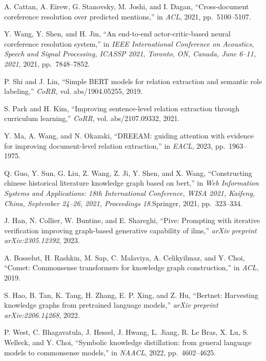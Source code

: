 \begin{enumerate}[leftmargin=2em,label={[\arabic*]}]
\item A. Cattan, A. Eirew, G. Stanovsky, M. Joshi, and I. Dagan, ``Cross-document coreference resolution over predicted mentions,'' in \textit{ACL}, 2021, pp.~5100--5107.

\item Y. Wang, Y. Shen, and H. Jin, ``An end-to-end actor-critic-based neural coreference resolution system,'' in \textit{IEEE International Conference on Acoustics, Speech and Signal Processing, ICASSP 2021, Toronto, ON, Canada, June 6--11, 2021}, 2021, pp.~7848--7852.

\item P. Shi and J. Lin, ``Simple BERT models for relation extraction and semantic role labeling,'' \textit{CoRR}, vol. abs/1904.05255, 2019.

\item S. Park and H. Kim, ``Improving sentence-level relation extraction through curriculum learning,'' \textit{CoRR}, vol. abs/2107.09332, 2021.

\item Y. Ma, A. Wang, and N. Okazaki, ``DREEAM: guiding attention with evidence for improving document-level relation extraction,'' in \textit{EACL}, 2023, pp.~1963--1975.

\item Q. Guo, Y. Sun, G. Liu, Z. Wang, Z. Ji, Y. Shen, and X. Wang, ``Constructing chinese historical literature knowledge graph based on bert,'' in \textit{Web Information Systems and Applications: 18th International Conference, WISA 2021, Kaifeng, China, September 24--26, 2021, Proceedings 18}.\quad Springer, 2021, pp.~323--334.

\item J. Han, N. Collier, W. Buntine, and E. Shareghi, ``Pive: Prompting with iterative verification improving graph-based generative capability of ilms,'' \textit{arXiv preprint arXiv:2305.12392}, 2023.

\item A. Bosselut, H. Rashkin, M. Sap, C. Malaviya, A. Celikyilmaz, and Y. Choi, ``Comet: Commonsense transformers for knowledge graph construction,'' in \textit{ACL}, 2019.

\item S. Hao, B. Tan, K. Tang, H. Zhang, E. P. Xing, and Z. Hu, ``Bertnet: Harvesting knowledge graphs from pretrained language models,'' \textit{arXiv preprint arXiv:2206.14268}, 2022.

\item P. West, C. Bhagavatula, J. Hessel, J. Hwang, L. Jiang, R. Le Bras, X. Lu, S. Welleck, and Y. Choi, ``Symbolic knowledge distillation: from general language models to commonsense models,'' in \textit{NAACL}, 2022, pp.~4602--4625.


\end{enumerate}
